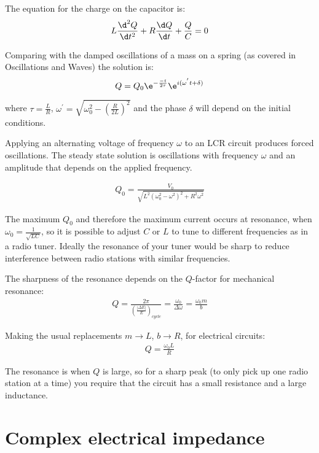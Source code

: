 \documentclass[
]{book}
\theoremstyle{definition}
\theoremstyle{definition}
\theoremstyle{definition}
\theoremstyle{definition}
\theoremstyle{remark}
\begin{document}
The equation for the charge on the capacitor is:
\[L \frac{ \d^2 Q}{\d t^2} + R \frac{\d Q}{\d t} + \frac{Q}{C} = 0\]

Comparing with the damped oscillations of a mass on a spring (as covered
in Oscillations and Waves) the solution is:
\[Q = Q_0 \e^{ - \frac{-t}{2\tau} } \e^{i(\omega^{'} t + \delta)}\]

where \(\tau = \frac{L}{R}\),
\(\omega^{'} = \sqrt{ \omega_0^2 - \left( \frac{R}{2 L} \right)^2}\) and
the phase \(\delta\) will depend on the initial conditions.

Applying an alternating voltage of frequency \(\omega\) to an LCR circuit
produces forced oscillations. The steady state solution is oscillations
with frequency \(\omega\) and an amplitude that depends on the applied
frequency.

\[\begin{aligned}
Q_0 = \frac{V_0}{\sqrt{ L^2 (\omega_0^2 - \omega^2)^2 + R^2 \omega^2 }}
\end{aligned}\]

The maximum \(Q_0\) and therefore the maximum current occurs at resonance,
when \(\omega_0 = \frac{1}{\sqrt{LC}}\), so it is possible to adjust \(C\)
or \(L\) to tune to different frequencies as in a radio tuner. Ideally the
resonance of your tuner would be sharp to reduce interference between
radio stations with similar frequencies.

The sharpness of the resonance depends on the \(Q\)-factor for mechanical
resonance: \[\begin{aligned}
Q = \frac{2\pi}{ \left( \frac{|\Delta E|}{E} \right)_{cycle} } = \frac{\omega_0}{\Delta \omega} = \frac{\omega_0 m}{b}
\end{aligned}\]

Making the usual replacements \(m \rightarrow L\), \(b \rightarrow R\), for
electrical circuits: \[\begin{aligned}
Q = \frac{\omega_0 L}{R}
\end{aligned}\]

The resonance is when \(Q\) is large, so for a sharp peak (to only pick up
one radio station at a time) you require that the circuit has a small
resistance and a large inductance.

\hypertarget{complex-electrical-impedance}{%
\section{Complex electrical impedance}\label{complex-electrical-impedance}}
\end{document}
